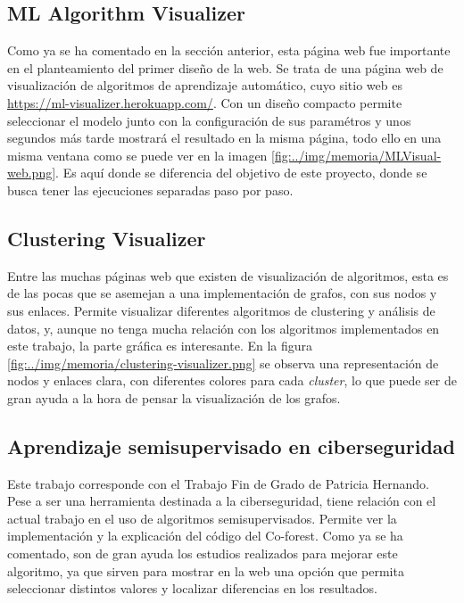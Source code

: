 \subsection{ML Algorithm Visualizer}
Como ya se ha comentado en la sección anterior, esta página web fue importante en el planteamiento del primer diseño de la web. Se trata de una página web de visualización de algoritmos de aprendizaje automático, cuyo sitio web es \url{https://ml-visualizer.herokuapp.com/}. Con un diseño compacto permite seleccionar el modelo junto con la configuración de sus paramétros y unos segundos más tarde mostrará el resultado en la misma página, todo ello en una misma ventana como se puede ver en la imagen \ref{fig:../img/memoria/MLVisual-web.png}. Es aquí donde se diferencia del objetivo de este proyecto, donde se busca tener las ejecuciones separadas paso por paso.


\subsection{Clustering Visualizer}
Entre las muchas páginas web que existen de visualización de algoritmos, esta es de las pocas que se asemejan a una implementación de grafos, con sus nodos y sus enlaces. Permite visualizar diferentes algoritmos de clustering y análisis de datos, y, aunque no tenga mucha relación con los algoritmos implementados en este trabajo, la parte gráfica es interesante. En la figura \ref{fig:../img/memoria/clustering-visualizer.png} se observa una representación de nodos y enlaces clara, con diferentes colores para cada \textit{cluster}, lo que puede ser de gran ayuda a la hora de pensar la visualización de los grafos.
\subsection{Aprendizaje semisupervisado en ciberseguridad}
Este trabajo corresponde con el Trabajo Fin de Grado de Patricia Hernando. Pese a ser una herramienta destinada a la ciberseguridad, tiene relación con el actual trabajo en el uso de algoritmos semisupervisados. Permite ver la implementación y la explicación del código del Co-forest. Como ya se ha comentado, son de gran ayuda los estudios realizados para mejorar este algoritmo, ya que sirven para mostrar en la web una opción que permita seleccionar distintos valores y localizar diferencias en los resultados.

